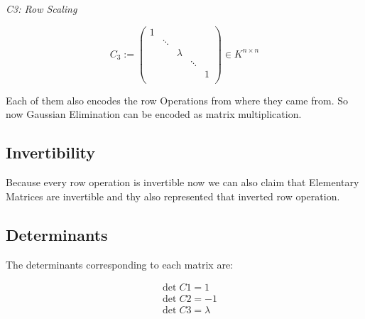 \emph{C3: Row Scaling}

\[
       C_3 := 
       \begin{pmatrix}
       1      &        &        &        &        \\
              & \ddots &        &        &        \\
              &        & \lambda &       &        \\
              &        &        & \ddots &        \\
              &        &        &        & 1      \\
       \end{pmatrix}
       \in K^{n \times n}
\]

Each of them also encodes the row Operations from where they came from.
So now Gaussian Elimination can be encoded as matrix multiplication.

\subsection{Invertibility}

Because every row operation is invertible now we can also claim that
Elementary Matrices are invertible and thy also represented that inverted row operation.

\subsection{Determinants}

The determinants corresponding to each matrix are:

\begin{align*}
&\det C1 = 1\\
&\det C2 = -1\\
&\det C3 = \lambda
\end{align*}

